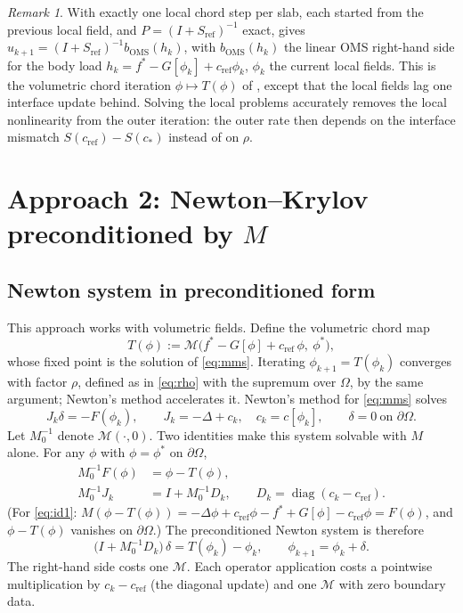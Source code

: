 \documentclass[11pt,a4paper]{article}
\theoremstyle{remark}\newtheorem{remark}{Remark}
\newcommand{\cR}{c_{\mathrm{ref}}}
\newcommand{\SolveM}{\mathcal{M}}
\DeclareMathOperator{\diag}{diag}
\begin{document}
\begin{remark}
With exactly one local chord step per slab, each started from the previous
local field, and $P=(I+S_{\mathrm{ref}})^{-1}$ exact, 
gives $u_{k+1}=(I+S_{\mathrm{ref}})^{-1}b_{\mathrm{OMS}}(h_k)$, with $b_{\mathrm{OMS}}(h_k)$ the linear OMS
right-hand side for the body load $h_k=f^*-G[\phi_k]+\cR\phi_k$, $\phi_k$ the
current local fields. This is the
volumetric chord iteration $\phi\mapsto T(\phi)$ of , except that
the local fields lag one interface update behind. Solving the local problems accurately removes the local
nonlinearity from the outer iteration: the outer rate then depends on the
interface mismatch $S(\cR)-S(c_*)$ instead of on $\rho$.
\end{remark}

\section{Approach 2: Newton--Krylov preconditioned by \texorpdfstring{$M$}{M}}\label{sec:nk}
\subsection{Newton system in preconditioned form}
This approach works with volumetric fields. Define the volumetric chord map
\begin{equation}\label{eq:T}
  T(\phi):=\SolveM\big(f^*-G[\phi]+\cR\,\phi,\ \phi^*\big),
\end{equation}
whose fixed point is the solution of \eqref{eq:mms}. Iterating
$\phi_{k+1}=T(\phi_k)$ converges with factor $\rho$, defined as in \eqref{eq:rho}
with the supremum over $\Omega$, by the same argument; Newton's method accelerates it.
Newton's method for \eqref{eq:mms} solves
\begin{equation}
  J_k\delta=-F(\phi_k),\qquad J_k=-\Delta+c_k,\quad c_k=c[\phi_k],\qquad \delta=0\ \text{on }\partial\Omega .
\end{equation}
Let $M_0^{-1}$ denote $\SolveM(\cdot,0)$. Two identities make this system
solvable with $M$ alone. For any $\phi$ with $\phi=\phi^*$ on $\partial\Omega$,
\begin{align}
  M_0^{-1}F(\phi)&=\phi-T(\phi), \label{eq:id1}\\
  M_0^{-1}J_k&=I+M_0^{-1}D_k,\qquad D_k=\diag(c_k-\cR). \label{eq:id2}
\end{align}
(For \eqref{eq:id1}: $M(\phi-T(\phi))=-\Delta\phi+\cR\phi-f^*+G[\phi]-\cR\phi=F(\phi)$,
and $\phi-T(\phi)$ vanishes on $\partial\Omega$.) The preconditioned Newton
system is therefore
\begin{equation}\label{eq:nk}
  \boxed{\;\big(I+M_0^{-1}D_k\big)\,\delta=T(\phi_k)-\phi_k,\qquad \phi_{k+1}=\phi_k+\delta .\;}
\end{equation}
The right-hand side costs one $\SolveM$. Each
operator application costs a pointwise multiplication by $c_k-\cR$ (the
diagonal update) and one $\SolveM$ with zero boundary data.
\end{document}
